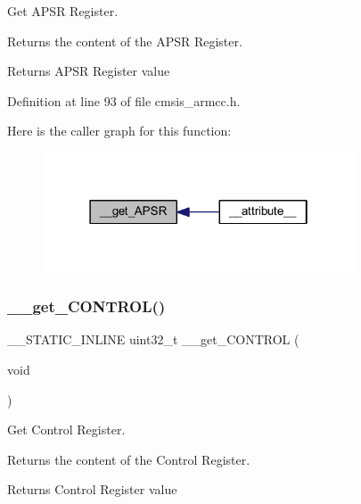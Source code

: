 Get A\+P\+SR Register. 

Returns the content of the A\+P\+SR Register. \begin{DoxyReturn}{Returns}
A\+P\+SR Register value 
\end{DoxyReturn}


Definition at line 93 of file cmsis\+\_\+armcc.\+h.

Here is the caller graph for this function\+:
\nopagebreak
\begin{figure}[H]
\begin{center}
\leavevmode
\includegraphics[width=262pt]{group___c_m_s_i_s___core___reg_acc_functions_gaf082254959c727c663f2334021f1a98a_icgraph}
\end{center}
\end{figure}
\mbox{\label{group___c_m_s_i_s___core___reg_acc_functions_ga5fe64567d5bf0a81c118374e9a3a4598}} 
\subsubsection{\texorpdfstring{\+\_\+\+\_\+get\+\_\+\+C\+O\+N\+T\+R\+O\+L()}{\_\_get\_CONTROL()}}
{\footnotesize\ttfamily \+\_\+\+\_\+\+S\+T\+A\+T\+I\+C\+\_\+\+I\+N\+L\+I\+NE uint32\+\_\+t \+\_\+\+\_\+get\+\_\+\+C\+O\+N\+T\+R\+OL (\begin{DoxyParamCaption}\item[{void}]{ }\end{DoxyParamCaption})}



Get Control Register. 

Returns the content of the Control Register. \begin{DoxyReturn}{Returns}
Control Register value 
\end{DoxyReturn}


